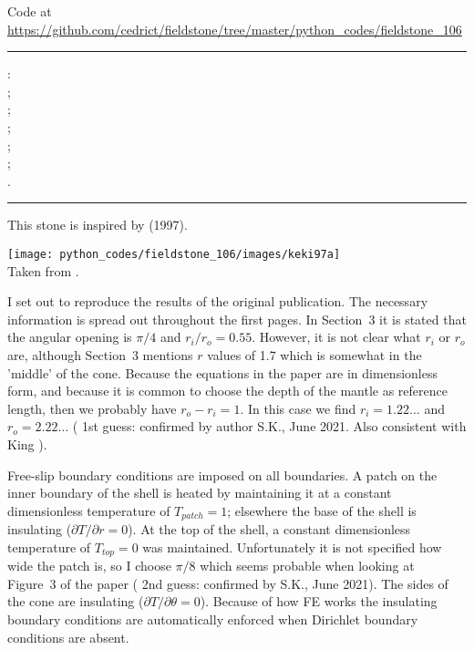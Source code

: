 

\begin{center}
Code at \url{https://github.com/cedrict/fieldstone/tree/master/python_codes/fieldstone_106}
\end{center}

\par\noindent\rule{\textwidth}{0.4pt}

\Literature:\\
;\\
;\\
;\\
;\\
;\\
.

\par\noindent\rule{\textwidth}{0.4pt}

\vspace{.5cm}

This stone is inspired by \textcite{keki97} (1997). 

\begin{center}
\texttt{[image: python\_codes/fieldstone\_106/images/keki97a]}\\
{\captionfont Taken from \cite{keki97}.}
\end{center}

I set out to reproduce the results of the original publication. 
The necessary information is spread out throughout the first pages.
In Section~3 it is stated that the angular opening is $\pi/4$ and $r_i/r_o=0.55$.
However, it is not clear what $r_i$ or $r_o$ are, although Section~3
mentions $r$ values of 1.7 which is somewhat in the 'middle' of the cone. 
Because the equations in the paper are in dimensionless form, and 
because it is common to choose the depth of the mantle as reference length, 
then we probably have $r_o-r_i=1$. In this case we find $r_i=1.22\dots$ and 
$r_o=2.22\dots$ ({\color{orange} 1st guess}: confirmed by author S.K., June 2021. 
Also consistent with King \cite{king97}).

Free-slip boundary conditions are imposed on all boundaries.
A patch on the inner boundary of the shell is heated by
maintaining it at a constant dimensionless temperature of $T_{patch}=1$; 
elsewhere the base of the shell is insulating ($\partial T/\partial r = 0$).
At the top of the shell, a constant dimensionless temperature of $T_{top}=0$ was maintained.
Unfortunately it is not specified how wide the patch is, so I choose 
$\pi/8$ which seems probable when looking at 
Figure~3 of the paper ({\color{orange} 2nd guess}: confirmed by S.K., June 2021).
The sides of the cone are insulating ($\partial T/\partial \theta =0$).
Because of how FE works the insulating boundary conditions are automatically enforced 
when Dirichlet boundary conditions are absent. 

